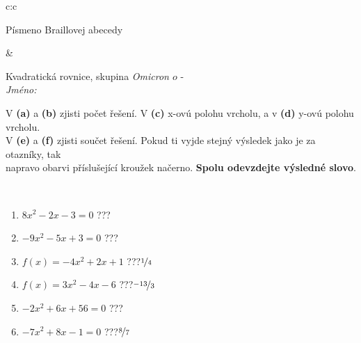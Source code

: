 \documentclass[10pt]{report}
\newcommand\omicron{o}
\begin{document}
\begin{tabular}{c:c}
\begin{minipage}[c][104.5mm][t]{0.5\linewidth}
\begin{center}
\begin{minipage}{0.20\linewidth}
\begin{center}
{\small Písmeno Braillovej abecedy}
\end{center}
\end{minipage}
\end{center}
\end{minipage}
&
\begin{minipage}[c][104.5mm][t]{0.5\linewidth}
\begin{center}
\vspace{7mm}
{\huge Kvadratická rovnice, skupina \textit{Omicron $\omicron$} -}\\[5mm]
\textit{Jméno:}\phantom{xxxxxxxxxxxxxxxxxxxxxxxxxxxxxxxxxxxxxxxxxxxxxxxxxxxxxxxxxxxxxxxxx}\\[5mm]
\begin{minipage}{0.95\linewidth}
\begin{center}
V \textbf{(a)} a \textbf{(b)} zjisti počet řešení. V \textbf{(c)} x-ovú polohu vrcholu, a v \textbf{(d)} y-ovú polohu vrcholu.\\V \textbf{(e)} a \textbf{(f)} zjisti součet řešení. Pokud ti vyjde stejný výsledek jako je za otazníky, tak\\napravo obarvi příslušející kroužek načerno. \textbf{Spolu odevzdejte výsledné slovo}.
\end{center}
\end{minipage}
\\[1mm]
\begin{minipage}{0.79\linewidth}
\begin{center}
\begin{varwidth}{\linewidth}
\begin{enumerate}
\Large
\item $8x^2-2x-3=0$\quad \dotfill\; ???\;\dotfill {}
\item $-9x^2-5x+3=0$\quad \dotfill\; ???\;\dotfill {}
\item $f(x)=-4x^2+2x+1$\quad \dotfill\; ???\;\dotfill \quad $\nicefrac{1}{4}$
\item $f(x)=3x^2-4x-6$\quad \dotfill\; ???\;\dotfill \quad $\nicefrac{-13}{3}$
\item $-2x^2+6x+56=0$\quad \dotfill\; ???\;\dotfill {}
\item $-7x^2+8x-1=0$\quad \dotfill\; ???\;\dotfill \quad $\nicefrac{8}{7}$
\end{enumerate}
\end{varwidth}
\end{center}
\end{minipage}
\begin{minipage}{0.20\linewidth}

\end{minipage}
\end{center}
\end{minipage}
\end{tabular}
\end{document}
